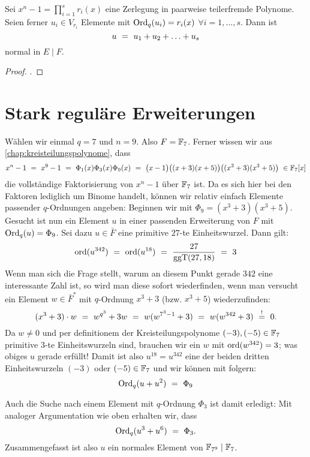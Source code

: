 \begin{kor}
  Sei $x^n-1 = \prod_{i=1}^s r_i(x)$ eine Zerlegung in paarweise teilerfremde
  Polynome. Seien ferner $u_i \in V_{r_i}$ Elemente mit 
  $\operatorname{Ord}_q(u_i) = r_i(x)$ $\forall i=1,\ldots,s$. Dann ist
  \[ u \ =\  u_1 + u_2 + \ldots + u_s\]
  normal in $E \mid F$.
\end{kor}
\begin{proof}
  .
\end{proof}

\section{Stark reguläre Erweiterungen}
\label{sec:stark_regulare_erweiterungen}

\begin{beispiel}
  \label{bsp:stark_regular_1}
  Wählen wir einmal $q = 7$ und $n=9$. Also $F = \mathbb{F}_7$.
  Ferner wissen wir aus \autoref{chap:kreisteilungspolynome}, dass
  \[ x^n-1 \ =\  x^9-1 \ =\  
    \Phi_1(x)\Phi_3(x)\Phi_9(x) \ =\ 
    \big(x-1\big)\big( (x+3)(x+5)\big)
    \big( (x^3+3)(x^3+5) \big) \ \in \mathbb{F}_7[x]\]
  die vollständige Faktorisierung von $x^n-1$ über $\mathbb{F}_7$ ist.
  Da es sich hier bei den Faktoren lediglich um Binome handelt, können wir
  relativ einfach Elemente passender $q$-Ordnungen angeben: Beginnen wir 
  mit $\Phi_9 = (x^3+3)(x^3+5)$. Gesucht ist nun ein Element $u$ in einer 
  passenden Erweiterung von $F$ mit $\operatorname{Ord}_q(u)= \Phi_9$.
  Sei dazu $u \in \bar F$ eine primitive $27$-te Einheitswurzel. Dann
  gilt:
  \[ \operatorname{ord}(u^{342}) \ =\  \operatorname{ord}(u^{18}) \ =\  \frac{27}{\operatorname{ggT}(27,18)} \ =\  3\]
  Wenn man sich die Frage stellt, warum an diesem Punkt gerade $342$ eine
  interessante Zahl ist, so wird man diese sofort wiederfinden, wenn man
  versucht ein Element $w\in \bar F^\ast$ mit $q$-Ordnung $x^3+3$ (bzw.
  $x^3+5$) wiederzufinden:
  \[ (x^3+3)\cdot w \ =\  w^{q^3} + 3 w \ =\  
    w(w^{7^3-1} +3) \ =\  w(w^{342}+3) \ \overset{!}{=}\  0.\]
  Da $w \neq 0$ und per definitionem der Kreisteilungspolynome 
  $(-3),(-5)\in \mathbb{F}_7$ primitive $3$-te Einheitswurzeln sind, 
  brauchen wir ein $w$ mit $\operatorname{ord}(w^{342}) = 3$; 
  was obiges $u$ gerade erfüllt! Damit ist also $u^{18} = u^{342}$ 
  eine der beiden dritten Einheitswurzeln $(-3)$ oder $(-5) \in \mathbb{F}_7$ und wir
  können mit  folgern:
  \[ \operatorname{Ord}_q(u + u^2) \ =\  \Phi_9\]

  Auch die Suche nach einem Element mit $q$-Ordnung $\Phi_3$ ist damit
  erledigt: Mit analoger Argumentation wie oben erhalten wir, dass 
  \[ \operatorname{Ord}_q(u^{3} + u^{6}) \ =\  \Phi_3.\]
  Zusammengefasst ist also $u$ ein normales Element von $\mathbb{F}_{7^9} \mid \mathbb{F}_7$.
\end{beispiel}

